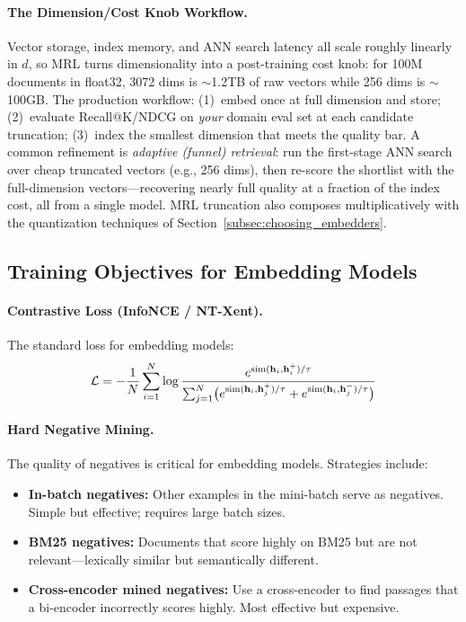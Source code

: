 \paragraph{The Dimension/Cost Knob Workflow.}
Vector storage, index memory, and ANN search latency all scale roughly
linearly in $d$, so MRL turns dimensionality into a post-training cost knob:
for 100M documents in float32, 3072 dims is $\sim$1.2TB of raw vectors while
256 dims is $\sim$100GB.  The production workflow: (1)~embed once at full
dimension and store; (2)~evaluate Recall@K/NDCG on \emph{your} domain eval
set at each candidate truncation; (3)~index the smallest dimension that
meets the quality bar.  A common refinement is \emph{adaptive (funnel)
retrieval}: run the first-stage ANN search over cheap truncated vectors
(e.g., 256 dims), then re-score the shortlist with the full-dimension
vectors---recovering nearly full quality at a fraction of the index cost,
all from a single model.  MRL truncation also composes multiplicatively
with the quantization techniques of
Section~\ref{subsec:choosing_embedders}.

\subsection{Training Objectives for Embedding Models}

\paragraph{Contrastive Loss (InfoNCE / NT-Xent).}
The standard loss for embedding models:
\[
    \mathcal{L} = -\frac{1}{N} \sum_{i=1}^{N} \log
    \frac{e^{\text{sim}(\mathbf{h}_i, \mathbf{h}_i^+)/\tau}}
         {\sum_{j=1}^{N}\bigl(
           e^{\text{sim}(\mathbf{h}_i, \mathbf{h}_j^+)/\tau}
           + e^{\text{sim}(\mathbf{h}_i, \mathbf{h}_j^-)/\tau}\bigr)}
\]

\paragraph{Hard Negative Mining.}
The quality of negatives is critical for embedding models.  Strategies include:
\begin{itemize}
    \item \textbf{In-batch negatives:} Other examples in the mini-batch serve
    as negatives.  Simple but effective; requires large batch sizes.
    \item \textbf{BM25 negatives:} Documents that score highly on BM25 but
    are not relevant---lexically similar but semantically different.
    \item \textbf{Cross-encoder mined negatives:} Use a cross-encoder to find
    passages that a bi-encoder incorrectly scores highly.  Most effective but
    expensive.
\end{itemize}


